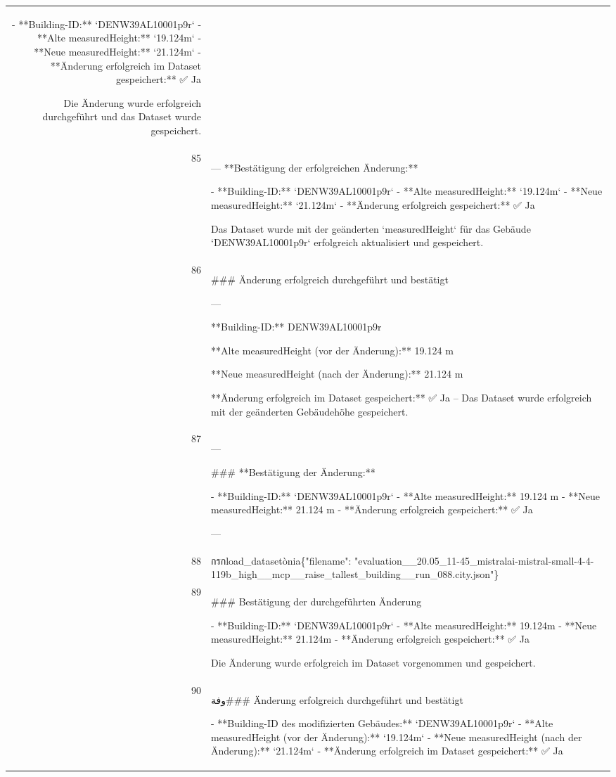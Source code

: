 \documentclass[a4paper,11pt]{article}
\begin{document}
\begin{table}[ht]
\begin{tabular}{r p{12cm}}
- **Building-ID:** `DENW39AL10001p9r`
- **Alte measuredHeight:** `19.124m`
- **Neue measuredHeight:** `21.124m`
- **Änderung erfolgreich im Dataset gespeichert:** ✅ Ja

Die Änderung wurde erfolgreich durchgeführt und das Dataset wurde gespeichert. \\
85 & ---
**Bestätigung der erfolgreichen Änderung:**

- **Building-ID:** `DENW39AL10001p9r`
- **Alte measuredHeight:** `19.124m`
- **Neue measuredHeight:** `21.124m`
- **Änderung erfolgreich gespeichert:** ✅ Ja

Das Dataset wurde mit der geänderten `measuredHeight` für das Gebäude `DENW39AL10001p9r` erfolgreich aktualisiert und gespeichert. \\
86 & \#\#\# Änderung erfolgreich durchgeführt und bestätigt

---

**Building-ID:**
DENW39AL10001p9r

**Alte measuredHeight (vor der Änderung):**
19.124 m

**Neue measuredHeight (nach der Änderung):**
21.124 m

**Änderung erfolgreich im Dataset gespeichert:**
✅ Ja – Das Dataset wurde erfolgreich mit der geänderten Gebäudehöhe gespeichert. \\
87 & ---

\#\#\# **Bestätigung der Änderung:**

- **Building-ID:** `DENW39AL10001p9r`
- **Alte measuredHeight:** 19.124 m
- **Neue measuredHeight:** 21.124 m
- **Änderung erfolgreich gespeichert:** ✅ Ja

--- \\
88 &  กรกload\_datasetònia\{"filename": "evaluation\_\_20.05\_11-45\_mistralai-mistral-small-4-4-119b\_high\_\_mcp\_\_raise\_tallest\_building\_\_run\_088.city.json"\} \\
89 & \#\#\# Bestätigung der durchgeführten Änderung

- **Building-ID:** `DENW39AL10001p9r`
- **Alte measuredHeight:** 19.124m
- **Neue measuredHeight:** 21.124m
- **Änderung erfolgreich gespeichert:** ✅ Ja

Die Änderung wurde erfolgreich im Dataset vorgenommen und gespeichert. \\
90 & وفة\#\#\# Änderung erfolgreich durchgeführt und bestätigt

- **Building-ID des modifizierten Gebäudes:** `DENW39AL10001p9r`
- **Alte measuredHeight (vor der Änderung):** `19.124m`
- **Neue measuredHeight (nach der Änderung):** `21.124m`
- **Änderung erfolgreich im Dataset gespeichert:** ✅ Ja


\end{tabular}
\end{table}
\end{document}
